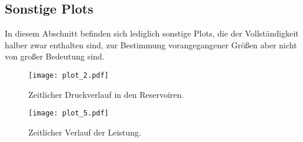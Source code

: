 \newpage

\subsection{Sonstige Plots}

In diesem Abschnitt befinden sich lediglich sonstige Plots, die der Vollständigkeit halber zwar enthalten sind, zur 
Bestimmung vorangegangener Größen aber nicht von großer Bedeutung sind.


\begin{figure}
  \centering
  \texttt{[image: plot\_2.pdf]}
  \caption{Zeitlicher Druckverlauf in den Reservoiren.}
  \label{fig:plot3}
\end{figure}


\begin{figure}
  \centering
  \texttt{[image: plot\_5.pdf]}
  \caption{Zeitlicher Verlauf der Leistung.}
  \label{fig:plot5}
\end{figure}

